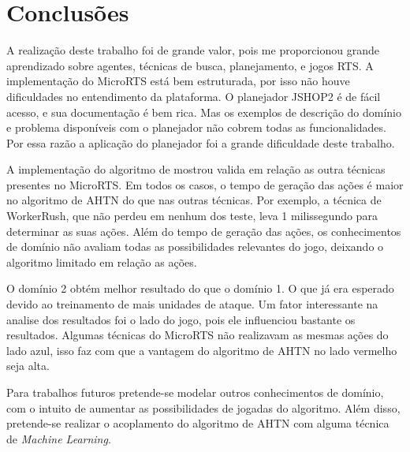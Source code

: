 
\chapter{\label{concl}Conclusões}


A realização deste trabalho foi de grande valor, pois me proporcionou grande aprendizado sobre agentes, técnicas de busca, planejamento, e jogos RTS.
A implementação do MicroRTS está bem estruturada, por isso não houve dificuldades no entendimento da plataforma.
O planejador JSHOP2 é de fácil acesso, e sua documentação é bem rica.
Mas os exemplos de descrição do domínio e problema disponíveis com o planejador não cobrem todas as funcionalidades.
Por essa razão a aplicação do planejador foi a grande dificuldade deste trabalho.

A implementação do algoritmo de mostrou valida em relação as outra técnicas presentes no MicroRTS.
Em todos os casos, o tempo de geração das ações é maior no algoritmo de AHTN do que nas outras técnicas.
Por exemplo, a técnica de WorkerRush, que não perdeu em nenhum dos teste, leva 1 milissegundo para determinar as suas ações.
Além do tempo de geração das ações, os conhecimentos de domínio não avaliam todas as possibilidades relevantes do jogo, deixando o algoritmo limitado em relação as ações.

O domínio 2 obtém melhor resultado do que o domínio 1.
O que já era esperado devido ao treinamento de mais unidades de ataque.
Um fator interessante na analise dos resultados foi o lado do jogo, pois ele influenciou bastante os resultados.
Algumas técnicas do MicroRTS não realizavam as mesmas ações do lado azul, isso faz com que a vantagem do algoritmo de AHTN no lado vermelho seja alta.


Para trabalhos futuros pretende-se modelar outros conhecimentos de domínio, com o intuito de aumentar as possibilidades de jogadas do algoritmo. 
Além disso, pretende-se realizar o acoplamento do algoritmo de AHTN com alguma técnica de \textit{Machine Learning}.

